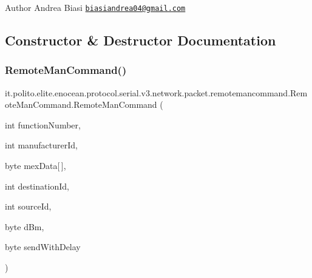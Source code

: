 \begin{DoxyAuthor}{Author}
Andrea Biasi \href{mailto:biasiandrea04@gmail.com}{\tt biasiandrea04@gmail.\+com} 
\end{DoxyAuthor}


\subsection{Constructor \& Destructor Documentation}
\hypertarget{classit_1_1polito_1_1elite_1_1enocean_1_1protocol_1_1serial_1_1v3_1_1network_1_1packet_1_1remoteb098a23adcfeb391a74cc6bc10c55d47_a46d391537cafd566c87dc1a21cbe616c}{}\label{classit_1_1polito_1_1elite_1_1enocean_1_1protocol_1_1serial_1_1v3_1_1network_1_1packet_1_1remoteb098a23adcfeb391a74cc6bc10c55d47_a46d391537cafd566c87dc1a21cbe616c} 
\subsubsection{\texorpdfstring{Remote\+Man\+Command()}{RemoteManCommand()}}
{\footnotesize\ttfamily it.\+polito.\+elite.\+enocean.\+protocol.\+serial.\+v3.\+network.\+packet.\+remotemancommand.\+Remote\+Man\+Command.\+Remote\+Man\+Command (\begin{DoxyParamCaption}\item[{int}]{function\+Number,  }\item[{int}]{manufacturer\+Id,  }\item[{byte}]{mex\+Data\mbox{[}$\,$\mbox{]},  }\item[{int}]{destination\+Id,  }\item[{int}]{source\+Id,  }\item[{byte}]{d\+Bm,  }\item[{byte}]{send\+With\+Delay }\end{DoxyParamCaption})}


